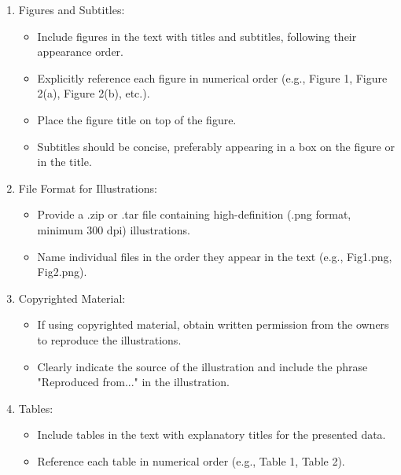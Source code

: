 \documentclass[twoside, 11pt]{article}
\begin{document}
\begin{enumerate}
   \item Figures and Subtitles:
      \begin{itemize}
         \item Include figures in the text with titles and subtitles, following their appearance order.
         \item Explicitly reference each figure in numerical order (e.g., Figure 1, Figure 2(a), Figure 2(b), etc.).
         \item Place the figure title on top of the figure.
         \item Subtitles should be concise, preferably appearing in a box on the figure or in the title.
      \end{itemize}

   \item File Format for Illustrations:
      \begin{itemize}
         \item Provide a .zip or .tar file containing high-definition (.png format, minimum 300 dpi) illustrations.
         \item Name individual files in the order they appear in the text (e.g., Fig1.png, Fig2.png).
      \end{itemize}

   \item Copyrighted Material:
      \begin{itemize}
         \item If using copyrighted material, obtain written permission from the owners to reproduce the illustrations.
         \item Clearly indicate the source of the illustration and include the phrase "Reproduced from..." in the illustration.
      \end{itemize}

   \item Tables:
      \begin{itemize}
         \item Include tables in the text with explanatory titles for the presented data.
         \item Reference each table in numerical order (e.g., Table 1, Table 2).


\end{itemize}
\end{enumerate}
\end{document}
